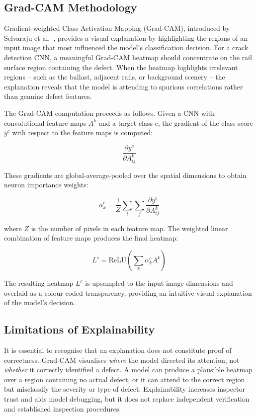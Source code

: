\documentclass[conference]{IEEE}
\begin{document}
\subsection{Grad-CAM Methodology}

Gradient-weighted Class Activation Mapping (Grad-CAM), introduced by Selvaraju et al.\ \cite{selvaraju2017}, provides a visual explanation by highlighting the regions of an input image that most influenced the model's classification decision. For a crack detection CNN, a meaningful Grad-CAM heatmap should concentrate on the rail surface region containing the defect. When the heatmap highlights irrelevant regions -- such as the ballast, adjacent rails, or background scenery -- the explanation reveals that the model is attending to spurious correlations rather than genuine defect features.

The Grad-CAM computation proceeds as follows. Given a CNN with convolutional feature maps $A^k$ and a target class $c$, the gradient of the class score $y^c$ with respect to the feature maps is computed:

\begin{equation}
\frac{\partial y^c}{\partial A^k_{ij}}
\end{equation}

These gradients are global-average-pooled over the spatial dimensions to obtain neuron importance weights:

\begin{equation}
\alpha_k^c = \frac{1}{Z} \sum_i \sum_j \frac{\partial y^c}{\partial A^k_{ij}}
\end{equation}

where $Z$ is the number of pixels in each feature map. The weighted linear combination of feature maps produces the final heatmap:

\begin{equation}
L^c = \text{ReLU}\left(\sum_k \alpha_k^c A^k\right)
\end{equation}

The resulting heatmap $L^c$ is upsampled to the input image dimensions and overlaid as a colour-coded transparency, providing an intuitive visual explanation of the model's decision.

\subsection{Limitations of Explainability}

It is essential to recognise that an explanation does not constitute proof of correctness. Grad-CAM visualises \textit{where} the model directed its attention, not \textit{whether} it correctly identified a defect. A model can produce a plausible heatmap over a region containing no actual defect, or it can attend to the correct region but misclassify the severity or type of defect. Explainability increases inspector trust and aids model debugging, but it does not replace independent verification and established inspection procedures.
\end{document}
